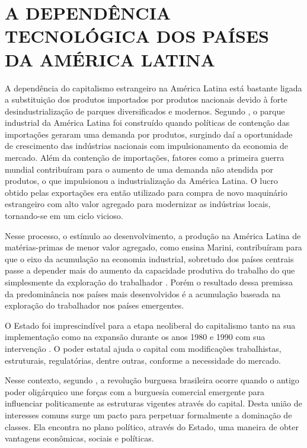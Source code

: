 \chapter{A DEPENDÊNCIA TECNOLÓGICA DOS PAÍSES DA AMÉRICA LATINA}
\label{chap:metodologia}

A dependência do capitalismo estrangeiro na América Latina está bastante ligada a substituição dos produtos importados por produtos nacionais devido à forte desindustrialização de parques diversificados e modernos. Segundo \cite{bambirra2012}, o parque industrial da América Latina foi construído quando políticas de contenção das importações geraram uma demanda por produtos, surgindo daí a oportunidade de crescimento das indústrias nacionais com impulsionamento da economia de mercado.  Além da contenção de importações, fatores como a primeira guerra mundial contribuíram para o aumento de uma demanda não atendida por produtos, o que impulsionou a industrialização da América Latina. O lucro obtido pelas exportações era então utilizado para compra de novo maquinário estrangeiro com alto valor agregado para modernizar as indústrias locais, tornando-se em um ciclo vicioso.

Nesse processo, o estímulo ao desenvolvimento, a produção na América Latina de matérias-primas de menor valor agregado, como ensina Marini, contribuíram para que o eixo da acumulação na economia industrial, sobretudo dos países centrais passe a depender mais do aumento da capacidade produtiva do trabalho do que simplesmente da exploração do trabalhador \cite{traspadini2005ruy}. Porém o resultado dessa premissa da predominância nos países mais desenvolvidos é a acumulação baseada na exploração do trabalhador nos países emergentes.

O Estado foi imprescindível para a etapa neoliberal do capitalismo tanto na sua implementação como na expansão durante os anos 1980 e 1990 com sua intervenção \cite{valencia2009reestruturaccao}. O poder estatal ajuda o capital com modificações trabalhistas, estruturais, regulatórias, dentre outras, conforme a necessidade do mercado.

Nesse contexto, segundo \cite{fernandes1975revoluccao}, a revolução burguesa brasileira ocorre quando o antigo poder oligárquico une forças com a burguesia comercial emergente para influenciar politicamente as estruturas vigentes através do capital. Desta união de interesses comuns surge um pacto para perpetuar formalmente a dominação de classes. Ela encontra no plano político, através do Estado, uma maneira de obter vantagens econômicas, sociais e políticas.

